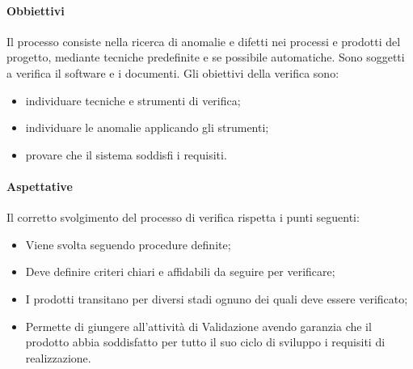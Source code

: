 			\paragraph{Obbiettivi}
				Il processo consiste nella ricerca di anomalie e difetti nei processi e prodotti del progetto, mediante tecniche predefinite e se possibile automatiche. Sono soggetti a verifica il software e i documenti. Gli obiettivi della verifica sono:
				\begin{itemize}
					\item  individuare tecniche e strumenti di verifica;
					\item  individuare le anomalie applicando gli strumenti;
					\item  provare che il sistema soddisfi i requisiti.
				\end{itemize}
			\paragraph{Aspettative}
				Il corretto svolgimento del processo di verifica rispetta i punti seguenti:\\
				\begin{itemize}
					\item  Viene svolta seguendo procedure definite;
					\item  Deve definire criteri chiari e affidabili da seguire per verificare;
					\item  I prodotti transitano per diversi stadi ognuno dei quali deve essere verificato;
					\item  Permette di giungere all’attività di Validazione avendo garanzia che il prodotto abbia soddisfatto per tutto il suo ciclo di sviluppo i requisiti di realizzazione.
				\end{itemize}
				

